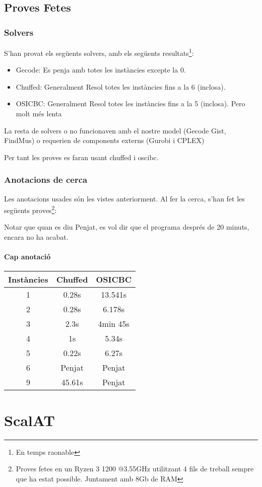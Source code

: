 \documentclass[11pt,a4paper,twoside]{report}
\begin{document}
\section{Proves Fetes}

\subsection{Solvers}

S'han provat els següents solvers, amb els següents resultats\footnote{En temps raonable}:

\begin{itemize}
    \item Gecode: Es penja amb totes les instàncies excepte la 0.
    \item Chuffed: Generalment Resol totes les instàncies fins a la 6 (inclosa).
    \item OSICBC: Generalment Resol totes les instàncies fins a la 5 (inclosa). Pero molt més lenta
\end{itemize}

La resta de solvers o no funcionaven amb el nostre model (Gecode Gist, FindMus) o requerien de components externs (Gurobi i CPLEX)

Per tant les proves es faran usant chuffed i oscibc. 

\subsection{Anotacions de cerca}

Les anotacions usades són les vistes anteriorment. Al fer la cerca, s'han fet les següents proves\footnote{Proves fetes en un Ryzen 3 1200 @3.55GHz utilitzant 4 fils de treball sempre que ha estat possible. Juntament amb 8Gb de RAM}:

Notar que quan es diu Penjat, es vol dir que el programa després de 20 minuts, encara no ha acabat. 

\subsubsection*{Cap anotació}


\begin{tabular}{|c|c|c|}
    \hline
    Instàncies & Chuffed & OSICBC \\
    \hline
    1 &  0.28s & 13.541s\\
    2 &  0.28s & 6.178s\\
    3 &  2.3s & 4min 45s\\
    4 &  1s & 5.34s\\
    5 &  0.22s & 6.27s\\
    6 &  Penjat & Penjat\\
    9 &  45.61s & Penjat\\

    \hline
    
\end{tabular}


\chapter{ScalAT}
\end{document}
